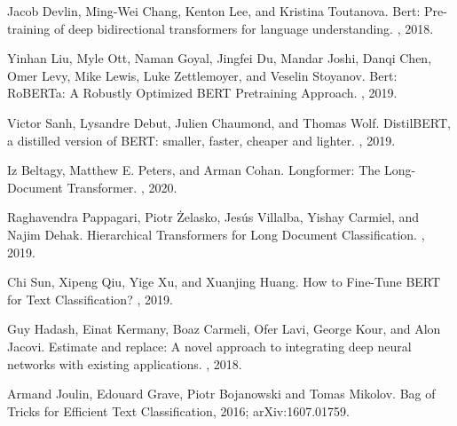 \documentclass[twocolumn,10pt]{wmrDoc}
\begin{document}



  


\begin{thebibliography}{1}

Jacob Devlin, Ming-Wei Chang, Kenton Lee, and Kristina Toutanova.
\newblock Bert: Pre-training of deep bidirectional transformers for language understanding.
, 2018.

Yinhan Liu, Myle Ott, Naman Goyal, Jingfei Du, Mandar Joshi, Danqi Chen, Omer Levy, Mike Lewis, Luke Zettlemoyer, and Veselin Stoyanov.
\newblock Bert: RoBERTa: A Robustly Optimized BERT Pretraining Approach.
, 2019.

Victor Sanh, Lysandre Debut, Julien Chaumond, and Thomas Wolf.
\newblock DistilBERT, a distilled version of BERT: smaller, faster, cheaper and lighter.
, 2019.

Iz Beltagy, Matthew E. Peters, and Arman Cohan.
\newblock Longformer: The Long-Document Transformer.
, 2020.

Raghavendra Pappagari, Piotr Żelasko, Jesús Villalba, Yishay Carmiel, and Najim Dehak.
\newblock Hierarchical Transformers for Long Document Classification.
, 2019.

Chi Sun, Xipeng Qiu, Yige Xu, and Xuanjing Huang.
\newblock How to Fine-Tune BERT for Text Classification?
, 2019.

Guy Hadash, Einat Kermany, Boaz Carmeli, Ofer Lavi, George Kour, and Alon
  Jacovi.
\newblock Estimate and replace: A novel approach to integrating deep neural
  networks with existing applications.
, 2018.

Armand Joulin, Edouard Grave, Piotr Bojanowski and Tomas Mikolov.
\newblock Bag of Tricks for Efficient Text Classification, 2016;
\newblock arXiv:1607.01759.


\end{thebibliography}
\end{document}
